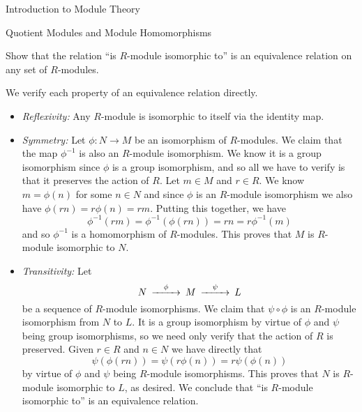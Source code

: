 \begin{chapter}{Introduction to Module Theory}
\begin{section}{Quotient Modules and Module Homomorphisms}
\begin{problem}\label{ex:10.2.2}
Show that the relation ``is $R$-module isomorphic to'' is an equivalence relation on any set of $R$-modules.
\end{problem}
\begin{solution}We verify each property of an equivalence relation directly. \begin{itemize}
\item \emph{Reflexivity:} Any $R$-module is isomorphic to itself via the identity map.
\item \emph{Symmetry:} Let $\phi:N\to M$ be an isomorphism of $R$-modules. We claim that the map $\phi^{-1}$ is also an $R$-module isomorphism. We know it is a group isomorphism since $\phi$ is a group isomorphism, and so all we have to verify is that it preserves the action of $R$. Let $m\in M$ and $r\in R$. We know $m=\phi(n)$ for some $n\in N$ and since $\phi$ is an $R$-module isomorphism we also have $\phi(rn) = r\phi(n) = rm$. Putting this together, we have\[
\phi^{-1}(rm) = \phi^{-1}(\phi(rn)) = rn = r\phi^{-1}(m)
\]
and so $\phi^{-1}$ is a homomorphism of $R$-modules. This proves that $M$ is $R$-module isomorphic to $N$.
\item \emph{Transitivity:} Let \[
\begin{CD} N@>\phi>> M @>\psi>> L\end{CD}\]
be a sequence of $R$-module isomorphisms. We claim that $\psi\circ\phi$ is an $R$-module isomorphism from $N$ to $L$. It is a group isomorphism by virtue of $\phi$ and $\psi$ being group isomorphisms, so we need only verify that the action of $R$ is preserved. Given $r\in R$ and $n\in N$ we have directly that \[
\psi(\phi(rn)) = \psi(r\phi(n)) = r\psi(\phi(n))
\]
by virtue of $\phi$ and $\psi$ being $R$-module isomorphisms. This proves that $N$ is $R$-module isomorphic to $L$, as desired. We conclude that ``is $R$-module isomorphic to'' is an equivalence relation. 
\end{itemize}

\end{solution}\oneperpage




\end{section}
\end{chapter}
